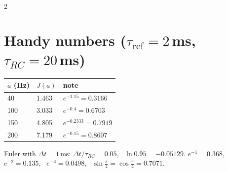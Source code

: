 \documentclass[9pt,letterpaper]{extarticle}
\newcommand{\tref}{\tau_{\mathrm{ref}}}
\newcommand{\trc}{\tau_{RC}}
\begin{document}
\begin{multicols}{2}
\section{Handy numbers ($\tref = 2$\,ms, $\trc = 20$\,ms)}
\begin{tabular}{@{}lll@{}}
$a$ (Hz) & $J(a)$ & note \\
\midrule
40 & 1.463 & $e^{-1.15} = 0.3166$\\
100 & 3.033 & $e^{-0.4} = 0.6703$\\
150 & 4.805 & $e^{-0.2333} = 0.7919$\\
200 & 7.179 & $e^{-0.15} = 0.8607$ \\
\end{tabular}

Euler with $\Delta t = 1$\,ms: $\Delta t/\trc = 0.05$, \ $\ln 0.95 = -0.05129$.
$e^{-1} = 0.368$, \ $e^{-2} = 0.135$, \ $e^{-3} = 0.0498$, \ $\sin\frac\pi4 = \cos\frac\pi4 = 0.7071$.

\end{multicols}
\end{document}
